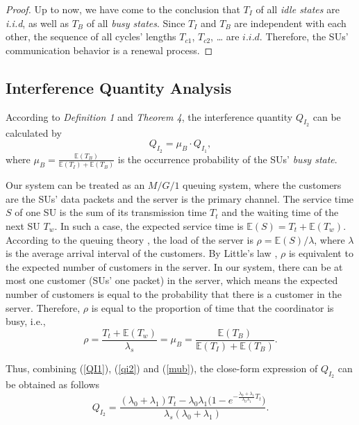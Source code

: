 \documentclass[11pt,draftcls]{IEEEtran}{\onecolumn}
\begin{document}
\begin{proof}
Up to now, we have come to the conclusion that $T_I$ of all
\emph{idle states} are \emph{i.i.d}, as well as $T_B$ of all
\emph{busy states}. Since $T_I$ and $T_B$ are independent with each
other, the sequence of all cycles' lengths $T_{c1}$, $T_{c2}$, \dots
are $i.i.d$. Therefore, the SUs' communication behavior is a renewal
process.
\end{proof}

\subsection{Interference Quantity Analysis}
According to \emph{Definition 1} and \emph{Theorem 4}, the
interference quantity $Q_{I_2}$ can be calculated by
\begin{equation}
Q_{I_2}=\mu_B\cdot Q_{I_1},\label{qi2}
\end{equation}
where $\mu_B=\frac{\mathbb E(T_B)}{\mathbb E(T_I)+\mathbb E(T_B)}$
is the occurrence probability of the SUs' \emph{busy state}.

Our system can be treated as an $M/G/1$ queuing system, where the
customers are the SUs' data packets and the server is the primary
channel. The service time $S$ of one SU is the sum of its
transmission time $T_t$ and the waiting time of the next SU $T_w$.
In such a case, the expected service time is $\mathbb
E(S)=T_t+\mathbb E(T_w)$. According to the queuing theory
\cite{queuing}, the load of the server is $\rho = \mathbb
E(S)/\lambda$, where $\lambda$ is the average arrival interval of
the customers. By Little's law \cite{queuing}, $\rho$ is equivalent
to the expected number of customers in the server. In our system,
there can be at most one customer (SUs' one packet) in the server,
which means the expected number of customers is equal to the
probability that there is a customer in the server. Therefore,
$\rho$ is equal to the proportion of time that the coordinator is
busy, i.e.,
\begin{equation}
\rho=\frac{T_t+\mathbb E(T_w)}{\lambda_s}=\mu_B=\frac{\mathbb E(T_B)}{\mathbb E(T_I)+\mathbb E(T_B)}.\label{mub}
\end{equation}

Thus, combining (\ref{QI1}), (\ref{qi2}) and (\ref{mub}), the
close-form expression of $Q_{I_2}$ can be obtained as follows
\begin{equation}
Q_{I_2}=\frac{(\lambda_0+\lambda_1)T_t-\lambda_0\lambda_1\Big(1-e^{-\frac{\lambda_0+\lambda_1}{\lambda_0\lambda_1}T_t}\Big)}
{\lambda_s(\lambda_0+\lambda_1)}.\label{QI2}
\end{equation}
\end{document}
